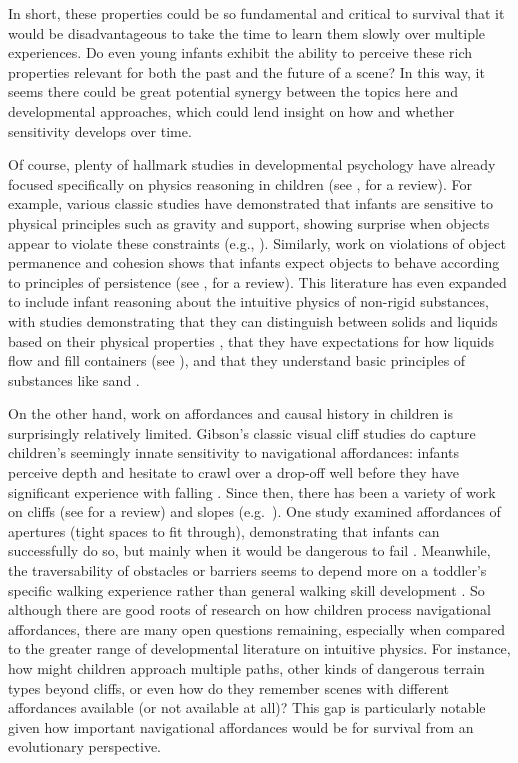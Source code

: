 In short, these properties could be so fundamental and critical to survival that it would be disadvantageous to take the time to learn them slowly over multiple experiences.  Do even young infants exhibit the ability to perceive these rich properties relevant for both the past and the future of a scene?  In this way, it seems there could be great potential synergy between the topics here and developmental approaches, which could lend insight on how and whether sensitivity develops over time.  

Of course, plenty of hallmark studies in developmental psychology have already focused specifically on physics reasoning in children (see \cite{spelke_precis_2024}, for a review).  For example, various classic studies have demonstrated that infants are sensitive to physical principles such as gravity and support, showing surprise when objects appear to violate these constraints (e.g., \cite{baillargeon_development_1992, hespos_reasoning_2001,stahl_observing_2015}). Similarly, work on violations of object permanence and cohesion shows that infants expect objects to behave according to principles of persistence (see \cite{baillargeon_innate_2008}, for a review).  This literature has even expanded to include infant reasoning about the intuitive physics of non-rigid substances, with studies demonstrating that they can distinguish between solids and liquids based on their physical properties \parencite{hespos_five-month-old_2009}, that they have expectations for how liquids flow and fill containers (see \cite{hespos_physics_2012}), and that they understand basic principles of substances like sand \parencite{hespos_five-month-old_2016}.  

On the other hand, work on affordances and causal history in children is surprisingly relatively limited. Gibson's classic visual cliff studies do capture children's seemingly innate sensitivity to navigational affordances: infants perceive depth and hesitate to crawl over a drop-off well before they have significant experience with falling \parencite{gibson_visual_1960}. Since then, there has been a variety of work on cliffs (see \cite{adolph_infants_2012} for a review) and slopes (e.g.~\cite{adolph_crawling_1993}).  One study examined affordances of apertures (tight spaces to fit through), demonstrating that infants can successfully do so, but mainly when it would be dangerous to fail \parencite{franchak_what_2012}.  Meanwhile, the traversability of obstacles or barriers seems to depend more on a toddler’s specific walking experience rather than general walking skill development \parencite{kingsnorth_walking_2000}.  So although there are good roots of research on how children process navigational affordances, there are many open questions remaining, especially when compared to the greater range of developmental literature on intuitive physics.  For instance, how might children approach multiple paths, other kinds of dangerous terrain types beyond cliffs, or even how do they remember scenes with different affordances available (or not available at all)?  This gap is particularly notable given how important navigational affordances would be for survival from an evolutionary perspective.

